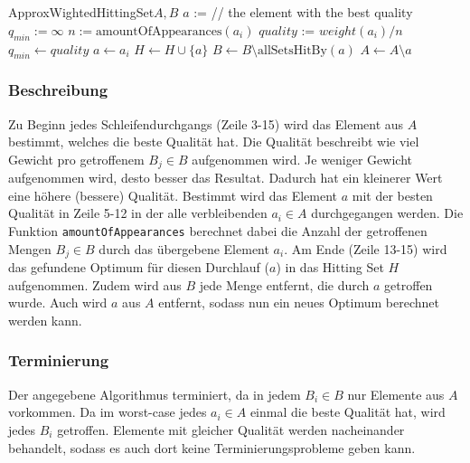 \documentclass[a4paper]{article}
\begin{document}
	\maketitle
	\section{}
		\begin{pseudocode}{ApproxWightedHittingSet}{$A, B$}
					\State $a$ := \Null \hfill // the element with the best quality
					\State $q_{min}:=\infty$
						\State $n := \text{amountOfAppearances}(a_i)$
						\State $quality$ := $weight(a_i) / n$
							\State $q_{min}\gets quality$
							\State $a\gets a_i$
						\EndIf
					\EndFor
					\State $H\gets H\cup \{a\}$
					\State $B\gets B\setminus\text{allSetsHitBy}(a)$
					\State $A\gets A\setminus a$
				\EndWhile
			\EndProcedure
		\end{pseudocode}
		\subsubsection*{Beschreibung}
		Zu Beginn jedes Schleifendurchgangs (Zeile 3-15) wird das Element aus $A$ bestimmt, welches die beste Qualität hat.
		Die Qualität beschreibt wie viel Gewicht pro getroffenem $B_j\in B$ aufgenommen wird.
		Je weniger Gewicht aufgenommen wird, desto besser das Resultat. Dadurch hat ein kleinerer Wert eine höhere (bessere) Qualität.\n
		Bestimmt wird das Element $a$ mit der besten Qualität in Zeile 5-12 in der alle verbleibenden $a_i\in A$ durchgegangen werden.
		Die Funktion \texttt{amountOfAppearances} berechnet dabei die Anzahl der getroffenen Mengen $B_j\in B$ durch das übergebene Element $a_i$.\n
		Am Ende (Zeile 13-15) wird das gefundene Optimum für diesen Durchlauf ($a$) in das Hitting Set $H$ aufgenommen.
		Zudem wird aus $B$ jede Menge entfernt, die durch $a$ getroffen wurde.
		Auch wird $a$ aus $A$ entfernt, sodass nun ein neues Optimum berechnet werden kann.
		\subsubsection*{Terminierung}
		Der angegebene Algorithmus terminiert, da in jedem $B_i\in B$ nur Elemente aus $A$ vorkommen. Da im worst-case jedes $a_i\in A$ einmal die beste Qualität hat, wird jedes $B_i$ getroffen. Elemente mit gleicher Qualität werden nacheinander behandelt, sodass es auch dort keine Terminierungsprobleme geben kann.
\end{document}
